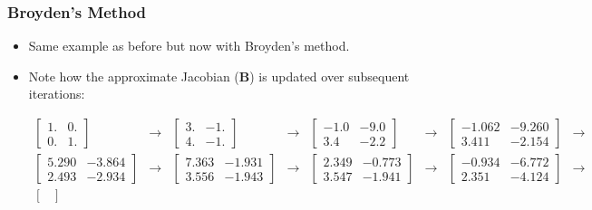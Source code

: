   
  \begin{frame}[fragile]
    \frametitle{Broyden's Method}
  
    \begin{itemize}
      \item Same example as before but now with Broyden's method.
      \item Note how the approximate Jacobian (\(\textbf{B}\)) is updated over subsequent iterations:
      
      \begin{tiny}
        \begin{align*}
          \begin{bmatrix}
          1. & 0. \\
          0. & 1.
          \end{bmatrix} & \rightarrow &
          \begin{bmatrix}
          3. & -1. \\
          4. & -1.
          \end{bmatrix} & \rightarrow &
          \begin{bmatrix}
          -1.0 & -9.0 \\
          3.4 & -2.2
          \end{bmatrix} & \rightarrow &
          \begin{bmatrix}
          -1.062 & -9.260 \\
          3.411 & -2.154
          \end{bmatrix} & \rightarrow &\\
          \begin{bmatrix}
          5.290 & -3.864 \\
          2.493 & -2.934
          \end{bmatrix} & \rightarrow &
          \begin{bmatrix}
          7.363 & -1.931 \\
          3.556 & -1.943
          \end{bmatrix} & \rightarrow &
          \begin{bmatrix}
          2.349 & -0.773 \\
          3.547 & -1.941
          \end{bmatrix} & \rightarrow &
          \begin{bmatrix}
          -0.934 & -6.772 \\
          2.351 & -4.124
          \end{bmatrix} & \rightarrow &\\
          \begin{bmatrix}

\end{bmatrix}
\end{align*}
\end{tiny}
\end{itemize}
\end{frame}
